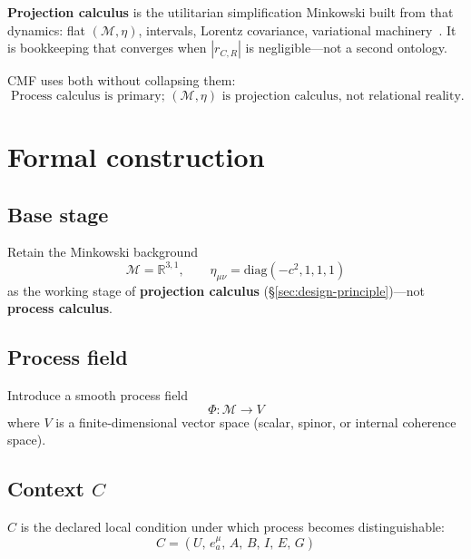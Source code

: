 \documentclass[11pt,a4paper]{article}
\newcommand{\M}{\mathcal{M}}
\newcommand{\Ph}{\Phi}
\begin{document}
\textbf{Projection calculus} is the utilitarian simplification Minkowski built from that dynamics: flat $(\M,\eta)$, intervals, Lorentz covariance, variational machinery~\cite{petrik2026cogenesis}. It is bookkeeping that converges when $|r_{C,R}|$ is negligible---not a second ontology.

CMF uses both without collapsing them:
\begin{equation}
  \boxed{\;\text{Process calculus is primary; $(\M,\eta)$ is projection calculus, not relational reality.}\;}
  \label{eq:zeroth-order}
\end{equation}

\section{Formal construction}

\subsection{Base stage}

Retain the Minkowski background
\begin{equation}
  \M = \mathbb{R}^{3,1}, \qquad \eta_{\mu\nu} = \mathrm{diag}(-c^2,1,1,1)
\end{equation}
as the working stage of \textbf{projection calculus} (\S\ref{sec:design-principle})---not \textbf{process calculus}.

\subsection{Process field}

Introduce a smooth process field
\begin{equation}
  \Ph : \M \to V
\end{equation}
where $V$ is a finite-dimensional vector space (scalar, spinor, or internal coherence space).

\subsection{Context \texorpdfstring{$C$}{C}}

$C$ is the declared local condition under which process becomes distinguishable:
\begin{equation}
  C = (U,\, e^\mu_a,\, A,\, B,\, I,\, E,\, G)
\end{equation}
\end{document}
